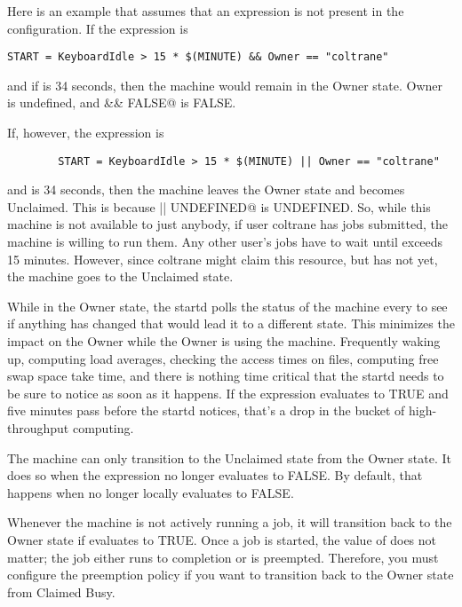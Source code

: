 Here is an example that assumes that an 
expression is not present in the configuration.
If the  expression is
\begin{verbatim}
START = KeyboardIdle > 15 * $(MINUTE) && Owner == "coltrane" 
\end{verbatim}
and if  is 34 seconds,
then the machine would remain in the Owner state.
Owner is undefined, and
\verb@anything && FALSE@ is FALSE.

If, however, the  expression is
\begin{verbatim}
        START = KeyboardIdle > 15 * $(MINUTE) || Owner == "coltrane"
\end{verbatim}
and  is 34 seconds, then the machine
leaves the Owner state and becomes Unclaimed.
This is because
\verb@FALSE || UNDEFINED@ is UNDEFINED.
So, while this machine is not available to just anybody,
if user coltrane has jobs submitted, the machine is willing to run them.
Any other user's jobs have to wait
until  exceeds 15 minutes.
However, since coltrane might claim this resource,
but has not yet, the machine goes to the Unclaimed state.

While in the Owner state, the startd polls the status of the
machine every  to see if anything has changed
that would lead it to a different state.
This minimizes the impact on the Owner
while the Owner is using the machine.
Frequently waking up, computing load averages, checking the access
times on files, computing free swap space take time,
and there is nothing
time critical that the startd needs to be sure to notice as soon as it
happens.
If the  expression evaluates to TRUE and five
minutes pass before the startd notices,
that's a drop in the bucket of high-throughput computing.

The machine can only transition to the Unclaimed state from the Owner
state. It does so when the  expression no longer
evaluates to FALSE.  By default, that happens when  no longer
locally evaluates to FALSE.

Whenever the machine is not actively running a job, it will transition
back to the Owner state if  evaluates to TRUE.  Once a
job is started, the value of  does not matter; the job
either runs to completion or is preempted.  Therefore, you must
configure the preemption policy if you want to transition back to the
Owner state from Claimed Busy.

